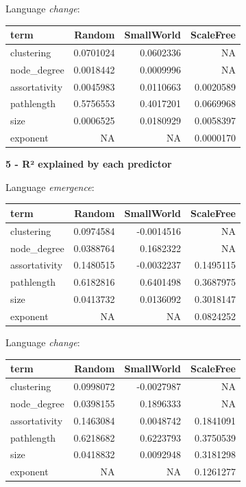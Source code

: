 \documentclass[
]{article}
\begin{document}
Language \emph{change}:

\begin{longtable}[]{@{}lrrr@{}}
\toprule()
term & Random & SmallWorld & ScaleFree \\
\midrule()
\endhead
clustering & 0.0701024 & 0.0602336 & NA \\
node\_degree & 0.0018442 & 0.0009996 & NA \\
assortativity & 0.0045983 & 0.0110663 & 0.0020589 \\
pathlength & 0.5756553 & 0.4017201 & 0.0669968 \\
size & 0.0006525 & 0.0180929 & 0.0058397 \\
exponent & NA & NA & 0.0000170 \\
\bottomrule()
\end{longtable}

\textbf{5 - R² explained by each predictor}

Language \emph{emergence}:

\begin{longtable}[]{@{}lrrr@{}}
\toprule()
term & Random & SmallWorld & ScaleFree \\
\midrule()
\endhead
clustering & 0.0974584 & -0.0014516 & NA \\
node\_degree & 0.0388764 & 0.1682322 & NA \\
assortativity & 0.1480515 & -0.0032237 & 0.1495115 \\
pathlength & 0.6182816 & 0.6401498 & 0.3687975 \\
size & 0.0413732 & 0.0136092 & 0.3018147 \\
exponent & NA & NA & 0.0824252 \\
\bottomrule()
\end{longtable}

Language \emph{change}:

\begin{longtable}[]{@{}lrrr@{}}
\toprule()
term & Random & SmallWorld & ScaleFree \\
\midrule()
\endhead
clustering & 0.0998072 & -0.0027987 & NA \\
node\_degree & 0.0398155 & 0.1896333 & NA \\
assortativity & 0.1463084 & 0.0048742 & 0.1841091 \\
pathlength & 0.6218682 & 0.6223793 & 0.3750539 \\
size & 0.0418832 & 0.0092948 & 0.3181298 \\
exponent & NA & NA & 0.1261277 \\
\bottomrule()
\end{longtable}
\end{document}
